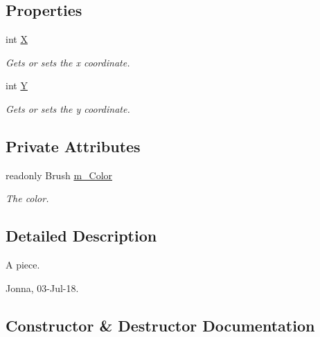 \subsection*{Properties}
\begin{DoxyCompactItemize}
\item 
int \mbox{\hyperlink{class_snake_1_1_piece_a282f8ec07e0127ffe506ba210e76efc8}{X}}
\begin{DoxyCompactList}\small\item\em Gets or sets the x coordinate. \end{DoxyCompactList}\item 
int \mbox{\hyperlink{class_snake_1_1_piece_a216699c0710be0b0b42ce568157e51b9}{Y}}
\begin{DoxyCompactList}\small\item\em Gets or sets the y coordinate. \end{DoxyCompactList}\end{DoxyCompactItemize}
\subsection*{Private Attributes}
\begin{DoxyCompactItemize}
\item 
readonly Brush \mbox{\hyperlink{class_snake_1_1_piece_aa23507020c98306f3397685b8ceaa325}{m\+\_\+\+Color}}
\begin{DoxyCompactList}\small\item\em The color. \end{DoxyCompactList}\end{DoxyCompactItemize}


\subsection{Detailed Description}
A piece. 

Jonna, 03-\/\+Jul-\/18. 

\subsection{Constructor \& Destructor Documentation}
\mbox{\label{class_snake_1_1_piece_a9bad54ea0c86794e056c58433b966f28}} 

